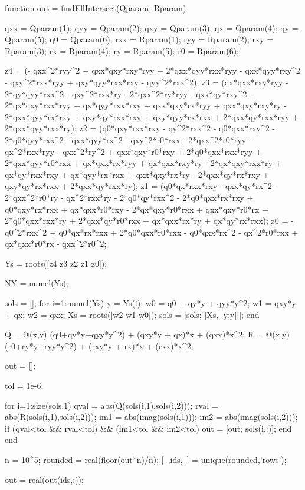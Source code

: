 \documentclass[12pt,openany,a4paper]{book}
\begin{document}
\begin{spverbatim}
function out = findEllIntersect(Qparam, Rparam)
%

qxx = Qparam(1);
qyy = Qparam(2);
qxy = Qparam(3);
qx = Qparam(4);
qy = Qparam(5);
q0 = Qparam(6);
rxx = Rparam(1);
ryy = Rparam(2);
rxy = Rparam(3);
rx = Rparam(4);
ry = Rparam(5);
r0 = Rparam(6);

z4 = (- qxx^2*ryy^2 + qxx*qxy*rxy*ryy + 2*qxx*qyy*rxx*ryy - qxx*qyy*rxy^2 - qxy^2*rxx*ryy + qxy*qyy*rxx*rxy - qyy^2*rxx^2);
z3 = (qx*qxx*rxy*ryy - 2*qy*qyy*rxx^2 - qxy^2*rxx*ry - 2*qxx^2*ry*ryy - qxx*qy*rxy^2 - 2*qx*qxy*rxx*ryy + qx*qyy*rxx*rxy + qxx*qxy*rx*ryy +
 qxx*qxy*rxy*ry - 2*qxx*qyy*rx*rxy + qxy*qy*rxx*rxy + qxy*qyy*rx*rxx + 2*qxx*qy*rxx*ryy + 2*qxx*qyy*rxx*ry);
z2 = (q0*qxy*rxx*rxy - qy^2*rxx^2 - q0*qxx*rxy^2 - 2*q0*qyy*rxx^2 -
qxx*qyy*rx^2 - qxy^2*r0*rxx - 2*qxx^2*r0*ryy - qx^2*rxx*ryy -
qxx^2*ry^2 + qxx*qxy*r0*rxy + 2*q0*qxx*rxx*ryy + 2*qxx*qyy*r0*rxx +
qx*qxx*rx*ryy + qx*qxx*rxy*ry - 2*qx*qxy*rxx*ry + qx*qy*rxx*rxy +
qx*qyy*rx*rxx + qxx*qxy*rx*ry - 2*qxx*qy*rx*rxy + qxy*qy*rx*rxx +
2*qxx*qy*rxx*ry);
z1 = (q0*qx*rxx*rxy - qxx*qy*rx^2 - 2*qxx^2*r0*ry - qx^2*rxx*ry -
2*q0*qy*rxx^2 - 2*q0*qxx*rx*rxy + q0*qxy*rx*rxx + qx*qxx*r0*rxy -
2*qx*qxy*r0*rxx + qxx*qxy*r0*rx + 2*q0*qxx*rxx*ry + 2*qxx*qy*r0*rxx +
qx*qxx*rx*ry + qx*qy*rx*rxx);
z0 = - q0^2*rxx^2 + q0*qx*rx*rxx + 2*q0*qxx*r0*rxx - q0*qxx*rx^2 -
qx^2*r0*rxx + qx*qxx*r0*rx - qxx^2*r0^2;

Ys = roots([z4 z3 z2 z1 z0]);

NY = numel(Ys);

sols = [];
for i=1:numel(Ys)
    y = Ys(i);
    w0 = q0 + qy*y + qyy*y^2;
    w1 = qxy*y + qx;
    w2 = qxx;
    Xs = roots([w2 w1 w0]);
    sols = [sols; [Xs, [y;y]]];
end

Q = @(x,y) (q0+qy*y+qyy*y^2) + (qxy*y + qx)*x + (qxx)*x^2;
R = @(x,y) (r0+ry*y+ryy*y^2) + (rxy*y + rx)*x + (rxx)*x^2;

out = [];

tol = 1e-6;

for i=1:size(sols,1)
    qval = abs(Q(sols(i,1),sols(i,2)));
    rval = abs(R(sols(i,1),sols(i,2)));
    im1 = abs(imag(sols(i,1)));
    im2 = abs(imag(sols(i,2)));
    if (qval<tol && rval<tol) && (im1<tol && im2<tol)
        out = [out; sols(i,:)];
    end
end

n = 10^5;
rounded = real(floor(out*n)/n);
[~,ids,~] = unique(rounded,'rows');

out = real(out(ids,:));
\end{spverbatim}
\end{document}
